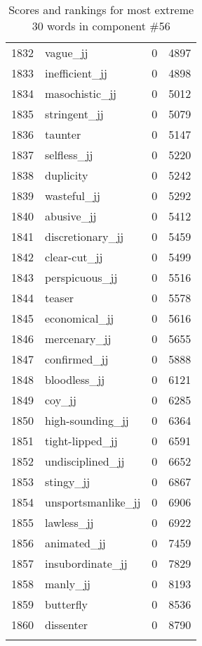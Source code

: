 \begin{longtable}[!htbp]{| rlr@{.}l |}
    1832 & vague\_jj & 0 & 4897 \\
    1833 & inefficient\_jj & 0 & 4898 \\
    1834 & masochistic\_jj & 0 & 5012 \\
    1835 & stringent\_jj & 0 & 5079 \\
    1836 & taunter & 0 & 5147 \\
    1837 & selfless\_jj & 0 & 5220 \\
    1838 & duplicity & 0 & 5242 \\
    1839 & wasteful\_jj & 0 & 5292 \\
    1840 & abusive\_jj & 0 & 5412 \\
    1841 & discretionary\_jj & 0 & 5459 \\
    1842 & clear-cut\_jj & 0 & 5499 \\
    1843 & perspicuous\_jj & 0 & 5516 \\
    1844 & teaser & 0 & 5578 \\
    1845 & economical\_jj & 0 & 5616 \\
    1846 & mercenary\_jj & 0 & 5655 \\
    1847 & confirmed\_jj & 0 & 5888 \\
    1848 & bloodless\_jj & 0 & 6121 \\
    1849 & coy\_jj & 0 & 6285 \\
    1850 & high-sounding\_jj & 0 & 6364 \\
    1851 & tight-lipped\_jj & 0 & 6591 \\
    1852 & undisciplined\_jj & 0 & 6652 \\
    1853 & stingy\_jj & 0 & 6867 \\
    1854 & unsportsmanlike\_jj & 0 & 6906 \\
    1855 & lawless\_jj & 0 & 6922 \\
    1856 & animated\_jj & 0 & 7459 \\
    1857 & insubordinate\_jj & 0 & 7829 \\
    1858 & manly\_jj & 0 & 8193 \\
    1859 & butterfly & 0 & 8536 \\
    1860 & dissenter & 0 & 8790 \\
    \hline
    \caption{Scores and rankings for most extreme 30 words in component \#56} \\
\end{longtable}
